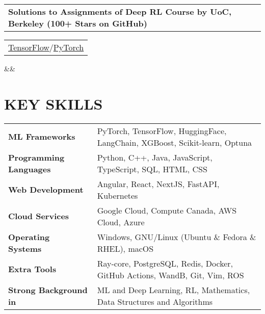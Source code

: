 \documentclass[11pt,a4paper,roman,colorlinks,linkcolor=blue,filecolor=magenta,urlcolor=cyan]{moderncv}        %
\makeatletter
\newcommand*{\customcvproject}[4][.25em]{%
  \begin{tabular}{@{}l} 
    {\bfseries #2} %
  \end{tabular}
  \hfill
  \begin{tabular}{l@{}}
    {#3} %
  \end{tabular}%
  \ifx&#4&%
  \else
    \\ %
    \begin{minipage}{\maincolumnwidth}%
      \small#4 %
    \end{minipage}%
  \fi
  \par\addvspace{#1}%
}
\makeatother
\begin{document}

{\customcvproject{Solutions to Assignments of Deep RL Course by UoC, Berkeley (100+ Stars on GitHub)}{ \href{https://github.com/erfanMhi/Deep-Reinforcement-Learning-CS285-Tensorflow}{TensorFlow}/\href{https://github.com/erfanMhi/Deep-Reinforcement-Learning-CS285-Pytorch}{PyTorch}}
{}

\vspace{-2mm}
\section{KEY SKILLS}
\begin{tabular}{ @{} >{\bfseries}l @{\hspace{6ex}} l }
ML Frameworks\ & PyTorch, TensorFlow, HuggingFace, LangChain, XGBoost, Scikit-learn, Optuna \\
Programming Languages\ & Python, C++, Java, JavaScript, TypeScript, SQL, HTML, CSS \\
Web Development\ & Angular, React, NextJS, FastAPI, Kubernetes \\
Cloud Services\ & Google Cloud, Compute Canada, AWS Cloud, Azure\\ 
Operating Systems\ & Windows, GNU/Linux (Ubuntu \& Fedora \& RHEL), macOS \\
Extra Tools\ & Ray-core, PostgreSQL, Redis, Docker, GitHub Actions, WandB, Git, Vim, ROS \\
Strong Background in\ & ML and Deep Learning, RL, Mathematics, Data Structures and Algorithms  \\
\end{tabular}
\newpage
  {
  }
}

\end{document}
